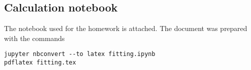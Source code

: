 \documentclass{article}
\begin{document}
\subsection{Calculation notebook}

The notebook used for the homework is attached.
The document was prepared with the commands
\begin{verbatim}
jupyter nbconvert --to latex fitting.ipynb
pdflatex fitting.tex
\end{verbatim}



\end{document}
